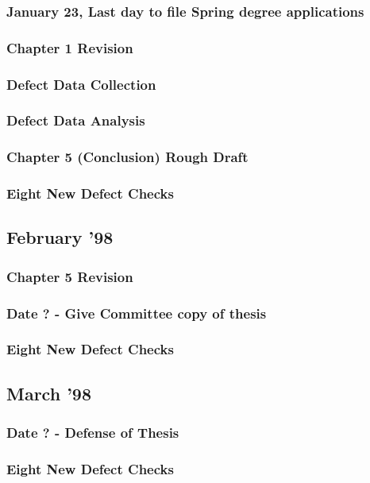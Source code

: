 \subsubsection{January 23, Last day to file Spring degree applications}
\subsubsection{Chapter 1 Revision}
\subsubsection{Defect Data Collection}
\subsubsection{Defect Data Analysis}
\subsubsection{Chapter 5 (Conclusion) Rough Draft}
\subsubsection{Eight New Defect Checks}

\subsection{February '98}
\subsubsection{Chapter 5 Revision}
\subsubsection{Date ? - Give Committee copy of thesis}
\subsubsection{Eight New Defect Checks}

\subsection{March '98}
\subsubsection{Date ? - Defense of Thesis}
\subsubsection{Eight New Defect Checks}

